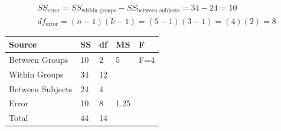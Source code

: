 \documentclass{tufte-handout}
\begin{document}
\begin{fullwidth}
\begin{align*}
&SS_{\text{error}}=SS_{\text{within groups}} - SS_{\text{between subjects}}=34-24=10\\
&df_{\text{error}}=(n-1)(k-1)=(5-1)(3-1)=(4)(2)=8
\end{align*}
\begin{table}
  \centering
  \selectfont
  \begin{tabular}{lllll}
    \toprule
    Source &  SS &  df &  MS &  F \\
    \midrule
    Between Groups & 10 & 2 &5 &F=4 \\
    Within Groups & 34&12 & & \\
\qquad Between Subjects & 24&4 & & \\
\qquad Error & 10& 8 &1.25 & \\
    Total & 44&14 & & \\
    \bottomrule
  \end{tabular}
  \label{tab:normaltab}
\end{table}


\end{fullwidth}
\end{document}
